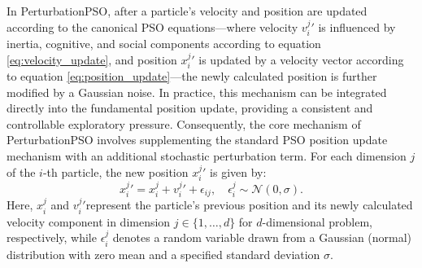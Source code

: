 {In PerturbationPSO, after a particle's velocity and position are updated according to the canonical PSO equations---where velocity $v_{i}^{j}{}'$ is influenced by inertia, cognitive, and social components according to equation \eqref{eq:velocity_update}, and position $x_{i}^{j}{}'$ is updated by a velocity vector according to equation \eqref{eq:position_update}---the newly calculated position is further modified by a Gaussian noise. In practice, this mechanism can be integrated directly into the fundamental position update, providing a consistent and controllable exploratory pressure. Consequently, the core mechanism of PerturbationPSO involves supplementing the standard PSO position update mechanism with an additional stochastic perturbation term. For each dimension $j$ of the $i$-th particle, the new position $x_{i}^{j}{}'$ is given by:
\begin{equation}\label{eq:position_update_perturbation}
x_{i}^{j}{}' = x_{i}^{j} + v_{i}^{j}{}' + \epsilon_{ij}, \quad \epsilon_{i}^{j} \sim \mathcal{N}(0, \sigma).
\end{equation}
Here, $x_{i}^{j}$ and $v_{i}^{j}{}'$represent the particle's previous position and its newly calculated velocity component in dimension $j \in \{1,\ldots, d\}$ for $d$-dimensional problem, respectively, while $\epsilon_{i}^{j}$ denotes a random variable drawn from a Gaussian (normal) distribution with zero mean and a specified standard deviation $\sigma$.

\begin{figure}[H]
    \centering
\end{figure}}
